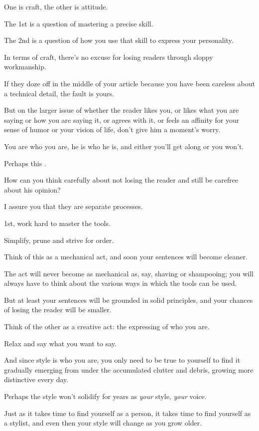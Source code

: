 \documentclass{book}
\numberwithin{equation}{section}
\begin{document}
One is craft, the other is attitude.

The 1st is a question of mastering a precise skill.

The 2nd is a question of how you use that skill to express your personality.

%
In terms of craft, there's no excuse for losing readers through sloppy workmanship.

If they doze off in the middle of your article because you have been careless about a technical detail, the fault is yours.

But on the larger issue of whether the reader likes you, or likes what you are saying or how you are saying it, or agrees with it, or feels an affinity for your sense of humor or your vision of life, don't give him a moment's worry.

You are who you are, he is who he is, and either you'll get along or you won't.

%
Perhaps this .

How can you think carefully about not losing the reader and still be carefree about his opinion?

I assure you that they are separate processes.

1st, work hard to master the tools.

Simplify, prune and strive for order.

Think of this as a mechanical act, and soon your sentences will become cleaner.

The act will never become as mechanical as, say, shaving or shampooing; you will always have to think about the various ways in which the tools can be used.

But at least your sentences will be grounded in solid principles, and your chances of losing the reader will be smaller.

%
Think of the other as a creative act: the expressing of who you are.

Relax and say what you want to say.

And since style is who you are, you only need to be true to yourself to find it gradually emerging from under the accumulated clutter and debris, growing more distinctive every day.

Perhaps the style won't solidify for years as \textit{your} style, \textit{your} voice.

Just as it takes time to find yourself as a person, it takes time to find yourself as a stylist, and even then your style will change as you grow older.
\end{document}
